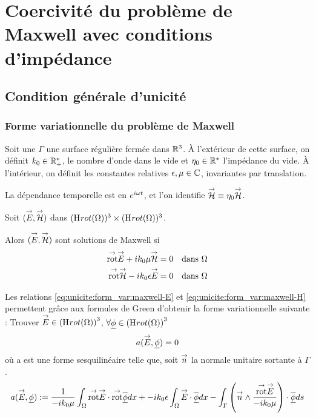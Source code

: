 \section{Coercivité du problème de Maxwell avec conditions d'impédance}
\subsection{Condition générale d'unicité}
\subsubsection{Forme variationnelle du problème de Maxwell}

Soit une $\Gamma$ une surface régulière fermée dans $\mathbb R^3$. 
À l'extérieur de cette surface, on définit $k_0 \in \mathbb R_+^*$, le nombre d'onde dans le vide et $\eta_0 \in \mathbb R^*$ l'impédance du vide.
À l'intérieur, on définit les constantes relatives $\epsilon,\mu \in \mathbb C$, invariantes par translation.

\begin{tcolorbox}
\centering
La dépendance temporelle est en $e^{i\omega t}$, et l'on identifie ${\overset{\rightarrow}{\mathcal{H}}} \equiv \eta _0 {\overset{\rightarrow}{\mathcal{H}}}$.
\end{tcolorbox}

Soit $({\overset{\rightarrow}{E}},{\overset{\rightarrow}{\mathcal{H}}})$ dans $(\mathrm{H}_\mathrm{{}}{rot}(\Omega))^3 \times (\mathrm{H}_\mathrm{{}}{rot}(\Omega))^3$. 

Alors $({\overset{\rightarrow}{E}},{\overset{\rightarrow}{\mathcal{H}}})$ sont solutions de Maxwell si 
\begin{align}
\label{eq:unicite:form_var:maxwell-E}
\trot \vE + ik_0 \mu \vH &= 0 && \text{dans $\OO$}
\\\label{eq:unicite:form_var:maxwell-H}
\trot \vH - ik_0\eps \vE &= 0 && \text{dans $\OO$}
  \end{align}

Les relations \eqref{eq:unicite:form_var:maxwell-E} et \eqref{eq:unicite:form_var:maxwell-H} permettent grâce aux formules de Green d'obtenir la forme variationnelle suivante :
Trouver ${\overset{\rightarrow}{E}} \in \left(\mathrm{H}_\mathrm{{}}{rot}(\Omega)\right)^3$, $\forall \underline{\phi} \in \left(\mathrm{H}_\mathrm{{}}{rot}(\Omega)\right)^3$
\[
a({\overset{\rightarrow}{E}},\underline{\phi}) = 0
\]
où a est une forme sesquilinéaire telle que, soit ${\overset{\rightarrow}{n}}$ la normale unitaire sortante à $\Gamma$.
\begin{align*}
a({\overset{\rightarrow}{E}},\underline{\phi}) &:=  \dfrac{1}{-ik_0\mu} \int_\Omega {{\overset{\rightarrow}{\operatorname{rot}}}} {\overset{\rightarrow}{E}} \cdot {{\overset{\rightarrow}{\operatorname{rot}}}} {\overline{\underline{\phi}}} dx + -ik_0\epsilon\int_\Omega{\overset{\rightarrow}{E}}\cdot{\overline{\underline{\phi}}} dx
 - \int_\Gamma \left({\overset{\rightarrow}{n}} \wedge \dfrac{{{\overset{\rightarrow}{\operatorname{rot}}}} {\overset{\rightarrow}{E}}}{-ik_0\mu}\right) \cdot {\overline{\underline{\phi}}} ds \\
 \end{align*}

